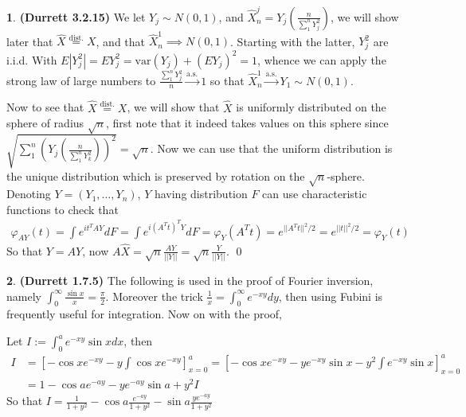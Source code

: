 \documentclass{article}
\theoremstyle{definition}
\newtheorem{pb}{}
\newcommand{\abs}[1]{\left\vert#1\right\vert}
\newcommand{\norm}[1]{\lvert\lvert#1\rvert\rvert}
\begin{document}
    \begin{pb}\textbf{(Durrett 3.2.15)}
        We let \(Y_j \sim N(0,1)\), and \(\hat{X}^j_n = Y_j(\frac{n}{\sum_1^n Y_j^2})\), we will show later that \(\hat{X} \overset{\text{dist.}}{=} X\), and that \(\hat{X}_n^1 \implies N(0,1)\). Starting with the latter, \(Y_j^2\) are i.i.d. With \(E \abs{Y_j^2} = E Y_j^2 = \text{var}(Y_j) + (E Y_j)^2 = 1\), whence we can apply the strong law of large numbers to \(\frac{\sum_1^n Y_j^2}{n} \overset{\text{a.s.}}{\longrightarrow} 1\) so that \(\hat{X}_n^1 \overset{\text{a.s.}}{\longrightarrow} Y_1 \sim N(0,1)\).

        Now to see that \(\hat{X} \overset{\text{dist.}}{=} X\), we will show that \(\hat{X}\) is uniformly distributed on the sphere of radius \(\sqrt{n}\), first note that it indeed takes values on this sphere since \(\sqrt{\sum_1^n \left(Y_j\left(\frac{n}{\sum_1^n Y_k^2}\right)\right)^2} = \sqrt{n}\). Now we can use that the uniform distribution is the unique distribution which is preserved by rotation on the \(\sqrt{n}\)-sphere. Denoting \(Y = (Y_1,\hdots,Y_n)\), \(Y\) having distribution \(F\) can use characteristic functions to check that
        \begin{align*}
            \varphi_{AY}(t) = \int e^{it^T AY}dF = \int e^{i(A^Tt)^TY}dF = \varphi_Y(A^Tt) = e^{\norm{A^Tt}^2/2} = e^{\norm{t}^2/2} = \varphi_Y(t)
        \end{align*}
        So that \(Y = AY\), now \(A\hat{X} = \sqrt{n}\frac{AY}{\norm{Y}} = \sqrt{n}\frac{Y}{\norm{Y}}\). \qed
    \end{pb}
    \begin{pb} \textbf{(Durrett 1.7.5)}
        The following is used in the proof of Fourier inversion, namely \(\int_0^\infty \frac{\sin x}{x} = \frac{\pi}{2}\). Moreover the trick \(\frac{1}{x} = \int_0^\infty e^{-xy}dy\), then using Fubini is frequently useful for integration. Now on with the proof,

        Let \(I := \int_0^a e^{-xy}\sin x dx\), then
        \begin{align*}
            I &= \left[-\cos x e^{-xy} - y\int \cos x e^{-xy}\right]_{x=0}^a = \left[-\cos x e^{-xy} - ye^{-xy}\sin x - y^2\int e^{-xy}\sin x\right]_{x=0}^a \\
            &= 1 -\cos a e^{-ay} - ye^{-ay}\sin a + y^2 I
        \end{align*}
        So that \(I = \frac{1}{1 + y^2} - \cos a \frac{e^{-ay}}{1 + y^2} - \sin a \frac{ye^{-ay}}{1+y^2}\)
    \end{pb}
\end{document}
